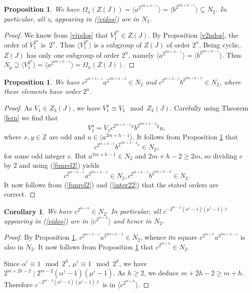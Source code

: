 \documentclass{amsart}
\newtheorem{prop}[theorem]{Proposition}
\newtheorem{cor}[theorem]{Corollary}
\theoremstyle{definition}
\theoremstyle{remark}
\newcommand \Z{{\mathbb Z}}
\begin{document}
{\begin{prop}\label{ordnzdos} We have $\Omega_n(Z(J))=\langle a^{2^{2m+h-1}}\rangle=\langle  b^{2^{2m+h-1}}\rangle\subseteq N_2$.
In particular, all $z_i$ appearing in (\ref{vidos})  are in $N_2$.
\end{prop}

\begin{proof} We know from \eqref{vipdos} that
$V_1^{2^n}\in Z(J)$. By Proposition \ref{v2ndos}, the order of $V_1^{2^n}$ is~$2^n$.
Thus $\langle V_1^{2^n}\rangle$ is a subgroup of $Z(J)$ of order $2^n$.
Being cyclic, $Z(J)$ has only one subgroup of order $2^n$, namely $\langle a^{2^{2m+h-1}}\rangle=\langle  b^{2^{2m+h-1}}\rangle$.
Thus $N_p\supseteq \langle V_1^{2^n}\rangle=\langle a^{2^{2m+h-1}}\rangle=\Omega_n(Z(J))$.
\end{proof}


\begin{prop}
\label{nor12} We have $c^{2^{m+h-1}}a^{2^{2m+h-2}}\in N_2$ and $c^{2^{m+h-1}}b^{2^{2m+h-2}}\in N_2$,
where these elements have order $2^n$.
\end{prop}

\begin{proof} As $V_1\in Z_3(J)$, we have $V_1^a\equiv V_1\mod Z_2(J)$. Carefully using Theorem \ref{fern} we find that
$$
V_1^a=V_1 c^{2^{m+h-1}x}b^{2^{2m+h-2}y}u,
$$
where $x,y\in\Z$ are odd and $u\in\langle a^{2m+h-1}\rangle$. It follows from Proposition \ref{ordnzdos} that
$$
c^{2^{m+h-1}}b^{2^{2m+h-2}e}\in N_2,
$$
for some odd integer $e$. But $a^{2m+h-1}\in N_2$ and $2m+h-2\geq 2m$, so dividing $e$ by 2 and using (\ref{funrel2}) yields
$$
c^{2^{m+h-1}}a^{2^{2m+h-2}}\in N_2, c^{2^{m+h-1}}b^{2^{2m+h-2}}\in N_2.
$$ 
It now follows from (\ref{funrel2}) and (\ref{inter22}) that the stated orders are correct.
\end{proof}

\begin{cor}
\label{potc} We have $c^{2^{m+h}}\in N_2$. In particular, all $c^{-2^{m-2}(\alpha^i-1)(\mu^i-1)\ell}$ 
appearing in (\ref{vidos})  are in $\langle c^{2^{m+h}}\rangle$
and hence in $N_2$.
\end{cor}

\begin{proof} By Proposition \ref{nor12}, $c^{2^{m+h-1}}a^{2^{2m+h-2}}\in N_2$, whence its square 
$c^{2^{m+h}}a^{2^{2m+h-1}}$ is also in $N_2$. It now follows from Proposition \ref{ordnzdos} that
$c^{2^{m+h}}\in N_2$.  

Since $\alpha^i\equiv 1\mod 2^h$, $\mu^i\equiv 1\mod 2^h$, we have $2^{m+2h-2}\mid 2^{m-2}(\alpha^i-1)(\mu^i-1)$. As $h\geq 2$,
we deduce $m+2h-2\geq m+h$. Therefore
$c^{-2^{m-2}(\alpha^i-1)(\mu^i-1)\ell}$ is in $\langle c^{2^{m+h}}\rangle$.
\end{proof}

}
\end{document}
